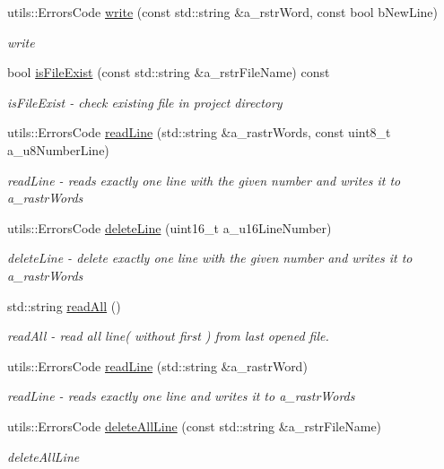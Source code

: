 \begin{DoxyCompactItemize}
utils\+::\+Errors\+Code \mbox{\hyperlink{classhelper_1_1_file_manager_acfeabee081f241c4e8d5a6f181584762}{write}} (const std\+::string \&a\+\_\+rstr\+Word, const bool b\+New\+Line)
\begin{DoxyCompactList}\small\item\em write \end{DoxyCompactList}\item 
bool \mbox{\hyperlink{classhelper_1_1_file_manager_ad68fd52b8f593f9e08046d1edd18c853}{is\+File\+Exist}} (const std\+::string \&a\+\_\+rstr\+File\+Name) const
\begin{DoxyCompactList}\small\item\em is\+File\+Exist -\/ check existing file in project directory \end{DoxyCompactList}\item 
utils\+::\+Errors\+Code \mbox{\hyperlink{classhelper_1_1_file_manager_a062addfd443a7b4092f8cab865d8de31}{read\+Line}} (std\+::string \&a\+\_\+rastr\+Words, const uint8\+\_\+t a\+\_\+u8\+Number\+Line)
\begin{DoxyCompactList}\small\item\em read\+Line -\/ reads exactly one line with the given number and writes it to a\+\_\+rastr\+Words \end{DoxyCompactList}\item 
utils\+::\+Errors\+Code \mbox{\hyperlink{classhelper_1_1_file_manager_a6b2ed7ad49524905359d08d5c95dc774}{delete\+Line}} (uint16\+\_\+t a\+\_\+u16\+Line\+Number)
\begin{DoxyCompactList}\small\item\em delete\+Line -\/ delete exactly one line with the given number and writes it to a\+\_\+rastr\+Words \end{DoxyCompactList}\item 
std\+::string \mbox{\hyperlink{classhelper_1_1_file_manager_acfae3833526e6306859612f5a1203960}{read\+All}} ()
\begin{DoxyCompactList}\small\item\em read\+All -\/ read all line( without first ) from last opened file. \end{DoxyCompactList}\item 
utils\+::\+Errors\+Code \mbox{\hyperlink{classhelper_1_1_file_manager_acc1e93732315d48528cb57d440ec4c25}{read\+Line}} (std\+::string \&a\+\_\+rastr\+Word)
\begin{DoxyCompactList}\small\item\em read\+Line -\/ reads exactly one line and writes it to a\+\_\+rastr\+Words \end{DoxyCompactList}\item 
utils\+::\+Errors\+Code \mbox{\hyperlink{classhelper_1_1_file_manager_a2ff9bcaf3345c13cd7eedb53e3f9841c}{delete\+All\+Line}} (const std\+::string \&a\+\_\+rstr\+File\+Name)
\begin{DoxyCompactList}\small\item\em delete\+All\+Line \end{DoxyCompactList}\end{DoxyCompactItemize}


